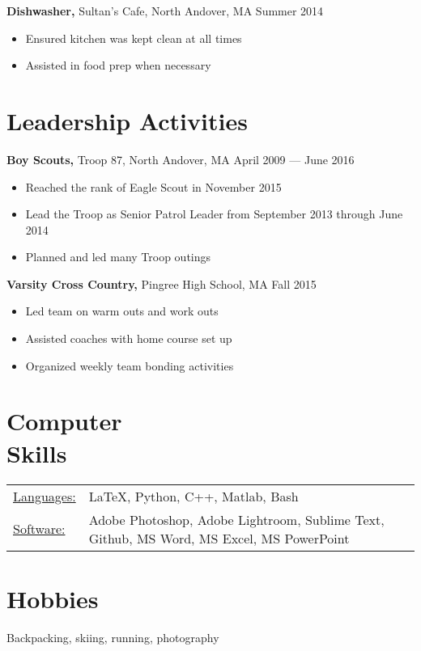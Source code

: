 \documentclass[margin]{res}
\begin{document}
\begin{resume}
	{\bf Dishwasher,} Sultan's Cafe, North Andover, MA \hfill Summer 2014
	\begin{itemize} \itemsep -2pt
		\item Ensured kitchen was kept clean at all times
		\item Assisted in food prep when necessary
	\end{itemize}

	\section{Leadership Activities}
	{\bf Boy Scouts,} Troop 87, North Andover, MA \hfill April 2009 --- June 2016
	\begin{itemize} \itemsep -2pt
		\item Reached the rank of Eagle Scout in November 2015
		\item Lead the Troop as Senior Patrol Leader from September 2013 through June 2014
		\item Planned and led many Troop outings
	\end{itemize}
	{\bf Varsity Cross Country,} Pingree High School, MA \hfill Fall 2015
	\begin{itemize} \itemsep -2pt
		\item Led team on warm outs and work outs
		\item Assisted coaches with home course set up
		\item Organized weekly team bonding activities
	\end{itemize}

	\section{Computer \\ Skills}
	\begin{tabular}{l p{3.7in}}
		\underline{Languages:} & \LaTeX, Python, C++, Matlab, Bash \tabularnewline

		\underline{Software:} & Adobe Photoshop, Adobe Lightroom, Sublime Text, Github, MS Word, MS Excel, MS PowerPoint
	\end{tabular}

	\section{Hobbies}
	Backpacking, skiing, running, photography

\end{resume}
\end{document}
